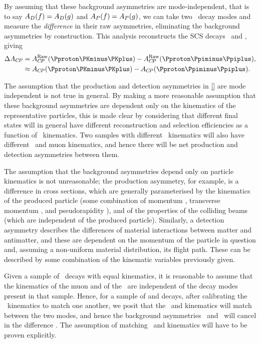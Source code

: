 
By assuming that these background asymmetries are mode-independent, that is to 
say $A_{D}(f) = A_{D}(g)$ and $A_{P}(f) = A_{P}(g)$, we can take two \PLambdac\ decay 
modes and measure the \emph{difference} in their raw asymmetries, eliminating 
the background asymmetries by construction.
This analysis reconstructs the \ac{SCS} decays \LcTopKK\ and \LcToppipi, giving
\begin{align}
  \dACP &= \ARaw(\pKK) - \ARaw(\ppipi),\label{eqn:cpv:theory:dacp}\\
        &\approx \ACP(\pKK) - \ACP(\ppipi)\nonumber.
\end{align}

The assumption that the production and detection asymmetries in \cref{} are 
mode independent is not true in general.
By making a more reasonable assumption that these background asymmetries are 
dependent only on the kinematics of the representative particles, this is made 
clear by considering that different final states will in general have different 
reconstruction and selection efficiencies as a function of \PLambdac\ 
kinematics.
Two samples with different \PLambdac\ kinematics will also have different 
\PLambdab\ and muon kinematics, and hence there will be net production and 
detection asymmetries between them.

The assumption that the background asymmetries depend only on particle 
kinematics is not unreasonable; the production asymmetry, for example, is a 
difference in cross sections, which are generally parameterised by the 
kinematics of the produced particle (some combination of momentum \ptot, 
transverse momentum \pT, and pseudorapidity \Eta), and of the properties of the 
colliding beams (which are independent of the produced particle).
Similarly, a detection asymmetry describes the differences of material 
interactions between matter and antimatter, and these are dependent on the 
momentum of the particle in question and, assuming a non-uniform material 
distribution, its flight path.
These can be described by some combination of the kinematic variables 
previously given.

Given a sample of \PLambdac\ decays with equal kinematics, it is reasonable to 
assume that the kinematics of the muon and of the \PLambdab\ are independent of 
the decay modes present in that sample.
Hence, for a sample of \LcTopKK and \LcToppipi decays, after calibrating the 
\PLambdac\ kinematics to match one another, we posit that the \PLambdab\ and 
\Pmuon kinematics will match between the two modes, and hence the background 
asymmetries \AP\ and \ADmu\ will cancel in the difference \dACP\@.
The assumption of matching \PLambdab\ and \Pmuon kinematics will have to be 
proven explicitly.

